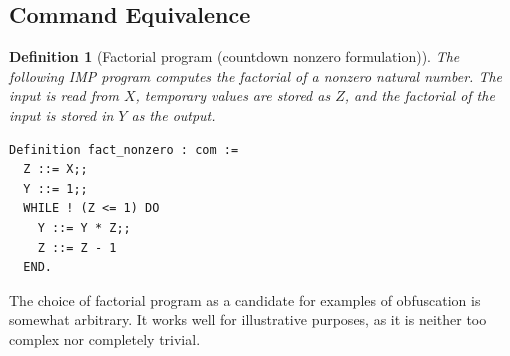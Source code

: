 \documentclass[compsoc,conference,a4paper,10pt,times]{IEEEtran}
\newtheorem{defin}[theorem]{Definition}
\begin{document}

\subsection{Command Equivalence}\label{naive}
\begin{defin}[Factorial program (countdown nonzero formulation)]\label{Fact}
    The following IMP program computes the factorial of a nonzero natural number.  The input is read from $X$, temporary values are stored as $Z$, and the factorial of the input is stored in $Y$ as the output.
\begin{verbatim}
Definition fact_nonzero : com :=
  Z ::= X;;
  Y ::= 1;;
  WHILE ! (Z <= 1) DO
    Y ::= Y * Z;;
    Z ::= Z - 1
  END.
\end{verbatim}
\end{defin}
%
    The choice of factorial program as a candidate for examples of obfuscation is somewhat arbitrary.  It works well for illustrative purposes, as it is neither too complex nor completely trivial.
\end{document}
